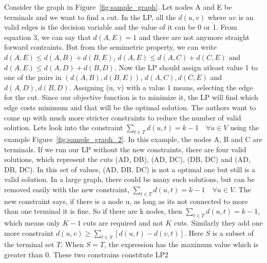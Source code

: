 \documentclass[11pt]{article}
\begin{document}
Consider the graph in Figure~\ref{fig:sample_graph}. Let nodes A and E be terminals and we want to find a cut. In the LP, all the $d(u,v)$ where $uv$ is an valid edges is the decision variable and the value of it can be 0 or 1. From equation 3, we can say that $d(A, E) = 1$ and there are not anymore straight forward contraints. But from the semimetric property, we can write $d(A, E) \le d(A, B) + d(B, E)$, $d(A, E) \le d(A, C) + d(C, E)$ and $d(A, E) \le d(A, D) + d(B, D)$. Now the LP should assign atleast value 1 to one of the pairs in $(d(A, B), d(B, E))$, $d(A, C), d(C, E)$ and $d(A, D), d(B, D)$. Assigning (u, v) with a value 1 means, selecting the edge for the cut. Since our objective function is to minimize it, the LP will find which edge costs minimum and that will be the optimal solution. The authors want to come up with much more stricter constraints to reduce the number of valid solution. Lets look into the constraint $\sum\limits_{t \in T}{d(u, t)} = k - 1 \quad \forall u \in V$ using the example Figure~\ref{fig:sample_graph_2}. In this example, the nodes A, B and C are terminals. If we run our LP without the new constraints, there are four valid solutions, which represent the cuts {(AD, DB), (AD, DC), (DB, DC) and (AD, DB, DC)}. In this set of values, (AD, DB, DC) is not a optimal one but still is a valid solution. In a large graph, there could be many such solutions, but can be removed easily with the new constraint, $\sum\limits_{t \in T}{d(u, t)} = k - 1 \quad \forall u \in V$. The new constraint says, if there is a node u, as long as its not connected to more than one terminal it is fine. So if there are k nodes, then $\sum\limits_{t \in T}{d(u, t)} = k - 1$, which means only $K-1$ cuts are required and not $K$ cuts. Similarly they add one more constraint $d(u, v) \ge \sum\limits_{t \in S}{[d(u, t) - d(v, t)]}$. Here $S$ is a subset of the terminal set $T$. When $S = T$, the expression has the maximum value which is greater than 0. These two constrains constitute LP2
\end{document}
